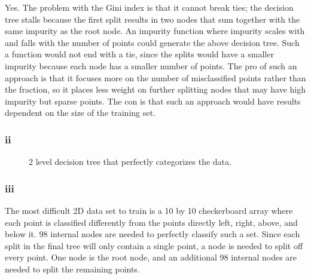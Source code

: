 \documentclass[12pt]{article} %
\begin{document}
Yes. The problem with the Gini index is that it cannot break ties; the decision tree stalls because the first split results in two nodes that sum together with the same impurity as the root node. An impurity function where impurity scales with and falls with the number of points could generate the above decision tree. Such a function would not end with a tie, since the splits would have a smaller impurity because each node has a smaller number of points. The pro of such an approach is that it focuses more on the number of misclassified points rather than the fraction, so it places less weight on further splitting nodes that may have high impurity but sparse points. The con is that such an approach would have results dependent on the size of the training set.

\subsubsection{ii}

\begin{figure}[H]
	\vspace{-10mm}
	\caption{2 level decision tree that perfectly categorizes the data.}
\end{figure}

\subsubsection{iii}
The most difficult 2D data set to train is a 10 by 10 checkerboard array where each point is classified differently from the points directly left, right, above, and below it. 98 internal nodes are needed to perfectly classify such a set. Since each split in the final tree will only contain a single point, a node is needed to split off every point. One node is the root node, and an additional 98 internal nodes are needed to split the remaining points.
\end{document}
